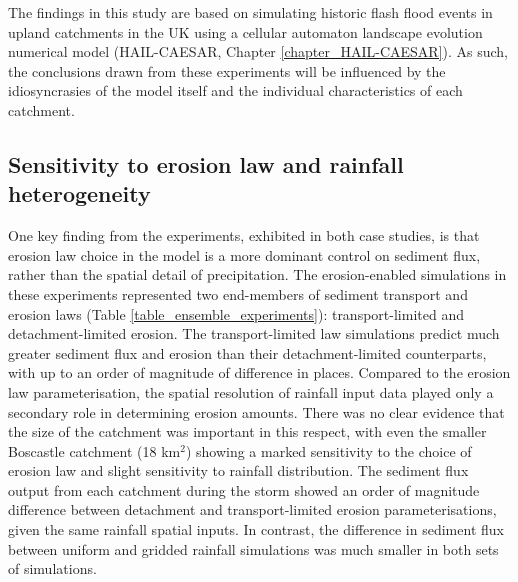 The findings in this study are based on simulating historic flash flood events in upland catchments in the UK using a cellular automaton landscape evolution numerical model (HAIL-CAESAR, Chapter \ref{chapter_HAIL-CAESAR}). As such, the conclusions drawn from these experiments will be influenced by the idiosyncrasies of the model itself and the individual characteristics of each catchment.

\subsection{Sensitivity to erosion law and rainfall heterogeneity} 
One key finding from the experiments, exhibited in both case studies, is that erosion law choice in the model is a more dominant control on sediment flux, rather than the spatial detail of precipitation. The erosion-enabled simulations in these experiments represented two end-members of sediment transport and erosion laws (Table \ref{table_ensemble_experiments}): transport-limited and detachment-limited erosion. The transport-limited law simulations predict much greater sediment flux and erosion than their detachment-limited counterparts, with up to an order of magnitude of difference in places. Compared to the erosion law parameterisation, the spatial resolution of rainfall input data played only a secondary role in determining erosion amounts. There was no clear evidence that the size of the catchment was important in this respect, with even the smaller Boscastle catchment (18 km\(^2\)) showing a marked sensitivity to the choice of erosion law and slight sensitivity to rainfall distribution. The sediment flux output from each catchment during the storm showed an order of magnitude difference between detachment and transport-limited erosion parameterisations, given the same rainfall spatial inputs. In contrast, the difference in sediment flux between uniform and gridded rainfall simulations was much smaller in both sets of simulations.

